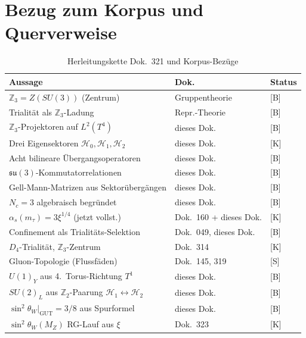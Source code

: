 \section{Bezug zum Korpus und Querverweise}

\begin{table}[h]
\centering
\caption{Herleitungskette Dok.~321 und Korpus-Bezüge}
\label{tab:korpus}
\begin{tabular}{lll}
\toprule
Aussage & Dok. & Status \\
\midrule
$\mathbb{Z}_3 = Z(SU(3))$ (Zentrum) & Gruppentheorie & [B] \\
Trialität als $\mathbb{Z}_3$-Ladung & Repr.-Theorie & [B] \\
$\mathbb{Z}_3$-Projektoren auf $L^2(T^4)$ & dieses Dok. & [B] \\
Drei Eigensektoren $\mathcal{H}_0,\mathcal{H}_1,\mathcal{H}_2$ & dieses Dok. & [K] \\
Acht bilineare Übergangsoperatoren & dieses Dok. & [B] \\
$\mathfrak{su}(3)$-Kommutatorrelationen & dieses Dok. & [B] \\
Gell-Mann-Matrizen aus Sektorübergängen & dieses Dok. & [B] \\
$N_c = 3$ algebraisch begründet & dieses Dok. & [B] \\
$\alpha_s(m_\tau) = 3\xi^{1/4}$ (jetzt vollst.) & Dok.~160 + dieses Dok. & [K] \\
Confinement als Trialitäts-Selektion & Dok.~049, dieses Dok. & [B] \\
$D_4$-Trialität, $\mathbb{Z}_3$-Zentrum & Dok.~314 & [K] \\
Gluon-Topologie (Flussfäden) & Dok.~145, 319 & [S] \\
$U(1)_Y$ aus 4.\ Torus-Richtung $T^1$ & dieses Dok. & [B] \\
$SU(2)_L$ aus $\mathbb{Z}_2$-Paarung $\mathcal{H}_1\leftrightarrow\mathcal{H}_2$ & dieses Dok. & [B] \\
$\sin^2\theta_W|_{\mathrm{GUT}} = 3/8$ aus Spurformel & dieses Dok. & [B] \\
$\sin^2\theta_W(M_Z)$ RG-Lauf aus $\xi$ & Dok.~323 & [K] \\
\bottomrule
\end{tabular}
\end{table}

